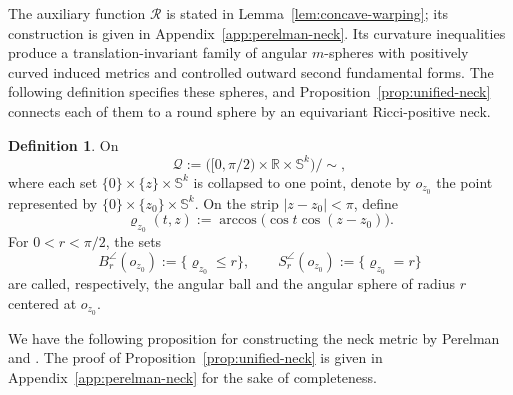 \documentclass[11pt,reqno]{amsart}
\theoremstyle{definition}
\newtheorem{definition}[theorem]{Definition}
\numberwithin{equation}{section}
\begin{document}
The auxiliary function \(\mathcal R\) is stated in
Lemma~\ref{lem:concave-warping}; its construction is given in
Appendix~\ref{app:perelman-neck}.  Its curvature inequalities produce
a translation-invariant family of angular \(m\)-spheres with positively
curved induced metrics and controlled outward second fundamental forms.
The following definition specifies these spheres, and
Proposition~\ref{prop:unified-neck} connects each of them to a round
sphere by an equivariant Ricci-positive neck.

\begin{definition}
On
\[\mathcal Q:=\bigl([0,\pi/2)\times\mathbb R\times\mathbb S^k\bigr)/\!\sim,
\]
where each set $\{0\}\times\{z\}\times\mathbb S^k$ is collapsed to one
point,
denote by $o_{z_0}$ the point represented by
$\{0\}\times\{z_0\}\times\mathbb S^k$.  On the strip
$|z-z_0|<\pi$, define
\[
 \varrho_{z_0}(t,z)
 :=\arccos\bigl(\cos t\cos(z-z_0)\bigr).
\]
For $0<r<\pi/2$, the sets
\[
 B_r^{\angle}(o_{z_0}):=\{\varrho_{z_0}\le r\},
 \qquad
 S_r^{\angle}(o_{z_0}):=\{\varrho_{z_0}=r\}
\]
are called, respectively, the angular ball and the angular sphere of
radius $r$ centered at $o_{z_0}$.
\end{definition}
We have the following proposition for constructing the neck metric by Perelman \cite[Assertion]{Perelman1997} and \cite[Section 3]{Perelman1997}. The proof of Proposition~\ref{prop:unified-neck} is given in
Appendix~\ref{app:perelman-neck} for the sake of completeness.
\end{document}

